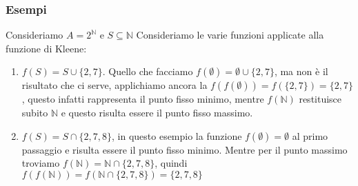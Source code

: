\subsubsection{Esempi}
Consideriamo $A=2^\mathbb{N}$ e $S \subseteq \mathbb{N}$
Consideriamo le varie funzioni applicate alla funzione di Kleene:
\begin{enumerate}
    \item $f(S) = S \cup \{2,7\}$. Quello che facciamo $f(\emptyset) = \emptyset \cup \{2,7\}$, ma non è il risultato che ci serve, applichiamo ancora la $f(f(\emptyset)) = f(\{2,7\}) = \{2,7\}$, questo infatti rappresenta il punto fisso minimo, mentre $f(\mathbb{N})$ restituisce subito $\mathbb{N}$ e questo risulta essere il punto fisso massimo. 
    \item $f(S) = S \cap \{2,7,8\}$, in questo esempio la funzione $f(\emptyset) = \emptyset$ al primo passaggio e risulta essere il punto fisso minimo. Mentre per il punto massimo troviamo $f(\mathbb{N}) = \mathbb{N} \cap \{2,7,8\}$, quindi $f(f(\mathbb{N})) = f(\mathbb{N} \cap \{2,7,8\}) = \{2,7,8\}$
\end{enumerate}